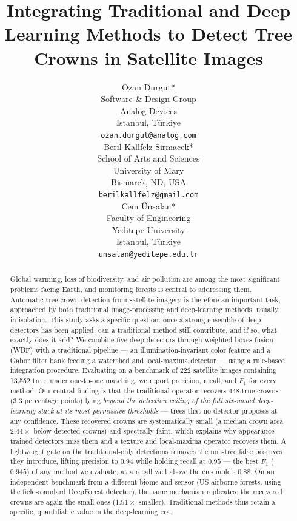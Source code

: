 \documentclass{article}
\title{Integrating Traditional and Deep Learning Methods to Detect Tree Crowns in Satellite Images}
\author{
  Ozan Durgut* \\
  Software \& Design Group \\
  Analog Devices \\
  Istanbul, Türkiye\\
  \texttt{ozan.durgut@analog.com} \\
   \And
  Beril Kallfelz-Sirmacek* \\
  School of Arts and Sciences \\
  University of Mary \\
  Bismarck, ND, USA\\
  \texttt{berilkallfelz@gmail.com} \\
  \And
  Cem Ünsalan*\\
  Faculty of Engineering \\
  Yeditepe University \\
  Istanbul, Türkiye\\
  \texttt{unsalan@yeditepe.edu.tr} \\
}
\begin{document}
\maketitle


\begin{abstract}
Global warming, loss of biodiversity, and air pollution are among the most significant problems facing Earth, and monitoring forests is central to addressing them. Automatic tree crown detection from satellite imagery is therefore an important task, approached by both traditional image-processing and deep-learning methods, usually in isolation. This study asks a specific question: once a strong ensemble of deep detectors has been applied, can a traditional method still contribute, and if so, what exactly does it add? We combine five deep detectors through weighted boxes fusion (WBF) with a traditional pipeline --- an illumination-invariant color feature and a Gabor filter bank feeding a watershed and local-maxima detector --- using a rule-based integration procedure. Evaluating on a benchmark of 222 satellite images containing 13{,}552 trees under one-to-one matching, we report precision, recall, and $F_1$ for every method. Our central finding is that the traditional operator recovers 448 true crowns (3.3 percentage points) lying \emph{beyond the detection ceiling of the full six-model deep-learning stack at its most permissive thresholds} --- trees that no detector proposes at any confidence. These recovered crowns are systematically small (a median crown area $2.44\times$ below detected crowns) and spectrally faint, which explains why appearance-trained detectors miss them and a texture and local-maxima operator recovers them. A lightweight gate on the traditional-only detections removes the non-tree false positives they introduce, lifting precision to $0.94$ while holding recall at $0.95$ --- the best $F_1$ ($0.945$) of any method we evaluate, at a recall well above the ensemble's $0.88$. On an independent benchmark from a different biome and sensor (US airborne forests, using the field-standard DeepForest detector), the same mechanism replicates: the recovered crowns are again the small ones ($1.91\times$ smaller). Traditional methods thus retain a specific, quantifiable value in the deep-learning era.
\end{abstract}


\let\thefootnote\relax{}
\end{document}
